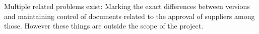 Multiple related problems exist: Marking the exact differences between versions and maintaining control of documents related to the approval of suppliers among those.
However these things are outside the scope of the project.


